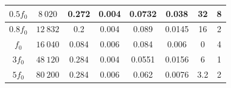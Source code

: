 \documentclass[12pt]{article}
\begin{document}
\begin{table}[H]
{\begin{tabular}{|c|c|c|c|c|c|c|c|}
        $0.5 f_0$ & $8 \: 020$                                               & 0.272                                                      & 0.004                                                             & 0.0732                                                     & 0.038                                                             & 32                                                                        & 8                                                                                  \\ \hline
        $0.8 f_0$ & $12 \: 832$                                              & 0.2                                                        & 0.004                                                             & 0.089                                                       & 0.0145                                                            & 16                                                                        & 2                                                                                  \\ \hline
        $f_0$     & $16 \: 040$                                              & 0.084                                                      & 0.006                                                             & 0.084                                                       & 0.006                                                             & 0                                                                         & 4                                                                                  \\ \hline
        $3 f_0$   & $48 \: 120$                                              & 0.284                                                      & 0.004                                                             & 0.0551                                                     & 0.0156                                                            & 6                                                                         & 1                                                                                  \\ \hline
        $5 f_0$   & $80 \: 200$                                              & 0.284                                                      & 0.006                                                             & 0.062                                                      & 0.0076                                                            & 3.2                                                                       & 2                                                                                  \\ \hline

\end{tabular}}
\end{table}
\end{document}
